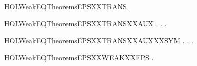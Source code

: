 \newcommand{\HOLWeakEQTheoremsEPSXXstrongindXXright}{\UseVerbatim{HOLWeakEQTheoremsEPSXXstrongindXXright}}
\begin{SaveVerbatim}{HOLWeakEQTheoremsEPSXXTRANS}
\HOLTokenTurnstile{} \HOLSymConst{\HOLTokenForall{}}  .    \HOLSymConst{\HOLTokenConj{}}    \HOLSymConst{\HOLTokenImp{}}   
\end{SaveVerbatim}
\newcommand{\HOLWeakEQTheoremsEPSXXTRANS}{\UseVerbatim{HOLWeakEQTheoremsEPSXXTRANS}}
\begin{SaveVerbatim}{HOLWeakEQTheoremsEPSXXTRANSXXAUX}
\HOLTokenTurnstile{} \HOLSymConst{\HOLTokenForall{}} .
          \HOLSymConst{\HOLTokenImp{}}
       \HOLSymConst{\HOLTokenForall{}} .
             \HOLSymConst{\HOLTokenConj{}}    \HOLSymConst{\HOLTokenImp{}}
           \HOLSymConst{\HOLTokenExists{}}.    \HOLSymConst{\HOLTokenConj{}}   
\end{SaveVerbatim}
\newcommand{\HOLWeakEQTheoremsEPSXXTRANSXXAUX}{\UseVerbatim{HOLWeakEQTheoremsEPSXXTRANSXXAUX}}
\begin{SaveVerbatim}{HOLWeakEQTheoremsEPSXXTRANSXXAUXXXSYM}
\HOLTokenTurnstile{} \HOLSymConst{\HOLTokenForall{}} .
          \HOLSymConst{\HOLTokenImp{}}
       \HOLSymConst{\HOLTokenForall{}} .
             \HOLSymConst{\HOLTokenConj{}}    \HOLSymConst{\HOLTokenImp{}}
           \HOLSymConst{\HOLTokenExists{}}.    \HOLSymConst{\HOLTokenConj{}}   
\end{SaveVerbatim}
\newcommand{\HOLWeakEQTheoremsEPSXXTRANSXXAUXXXSYM}{\UseVerbatim{HOLWeakEQTheoremsEPSXXTRANSXXAUXXXSYM}}
\begin{SaveVerbatim}{HOLWeakEQTheoremsEPSXXWEAKXXEPS}
\HOLTokenTurnstile{} \HOLSymConst{\HOLTokenForall{}}    .    \HOLSymConst{\HOLTokenConj{}}  \HOLTokenWeakTransBegin{}\HOLTokenWeakTransEnd {} \HOLSymConst{\HOLTokenConj{}}    \HOLSymConst{\HOLTokenImp{}}  \HOLTokenWeakTransBegin{}\HOLTokenWeakTransEnd {}
\end{SaveVerbatim}
